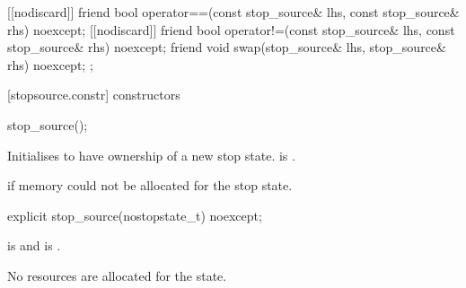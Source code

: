 {\begin{codeblock}
{{    [[nodiscard]] friend bool operator==(const stop_source& lhs, const stop_source& rhs) noexcept;
    [[nodiscard]] friend bool operator!=(const stop_source& lhs, const stop_source& rhs) noexcept;
    friend void swap(stop_source& lhs, stop_source& rhs) noexcept;
  };
}
\end{codeblock}

%
%
%
%

[stopsource.constr]{ constructors}

%
\begin{itemdecl}
stop_source();
\end{itemdecl}
\begin{itemdescr}
  \pnum\effects Initialises  to have ownership of a new stop state.
  \pnum\postconditions {} \tcode{\&\&}  is .

  \pnum\throws {} if memory could not be allocated for the stop state.
\end{itemdescr}

%
\begin{itemdecl}
explicit stop_source(nostopstate_t) noexcept;
\end{itemdecl}
\begin{itemdescr}
  \pnum\postconditions {} is  and
                        is .
                \begin{note} No resources are allocated for the state.  \end{note}
\end{itemdescr}

}
